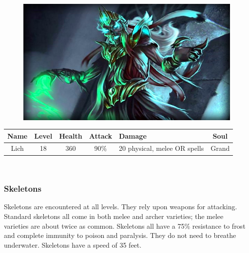 \documentclass[12pt]{book}
\begin{document}
\begin{figure}[h]
	\centering
	\includegraphics[scale=1]{lich.png}
\end{figure}

\begin{tabular}{|c|c|c|c|p{}|c|}
\hline
Name & Level & Health & Attack & Damage & Soul\\ \hline
Lich & 18 & 360 & 90\% & 20 physical, melee OR spells & Grand\\ \hline
\end{tabular}\\

\subsubsection{Skeletons}
Skeletons are encountered at all levels. They rely upon weapons for attacking. Standard skeletons all come in both melee and archer varieties; the melee varieties are about twice as common. Skeletons all have a 75\% resistance to frost and complete immunity to poison and paralysis. They do not need to breathe underwater. Skeletons have a speed of 35 feet.
\end{document}
